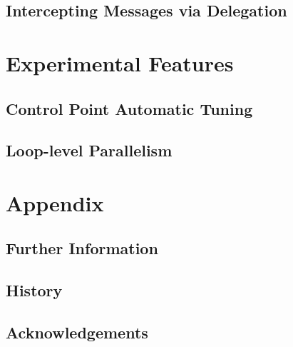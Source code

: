 \documentclass[10pt]{report}
\begin{document}
\chapter{Intercepting Messages via Delegation}
\label{delegation}
  

%


\part{Experimental Features}

\chapter{Control Point Automatic Tuning}
\label{sec:controlpoint}
  

\chapter{Loop-level Parallelism}
\label{sec:ckloop}
  

\part{Appendix}
\appendix

%

\chapter{Further Information}
  

\chapter{History}
  

\chapter {Acknowledgements}
  


\end{document}
